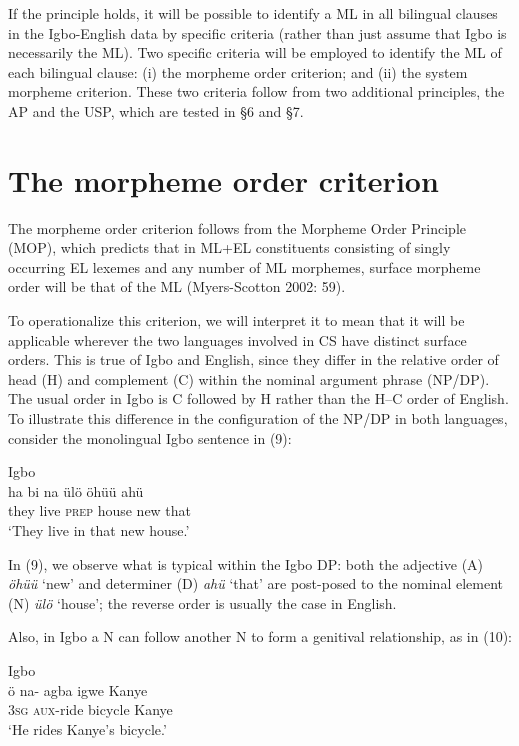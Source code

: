 \documentclass[output=paper]{langsci/langscibook}
\begin{document}
If the principle holds, it will be possible to identify a ML in all bilingual clauses in the Igbo-English data by specific criteria (rather than just assume that Igbo is necessarily the ML). Two specific criteria will be employed to identify the ML of each bilingual clause: (i) the morpheme order criterion; and (ii) the system morpheme criterion. These two criteria follow from two additional principles, the AP and the USP, which are tested in §6 and §7.

\section{The morpheme order criterion}

The morpheme order criterion follows from the Morpheme Order Principle (MOP), which predicts that in ML+EL constituents consisting of singly occurring EL lexemes and any number of ML morphemes, surface morpheme order will be that of the ML (Myers-Scotton 2002: 59). 

To operationalize this criterion, we will interpret it to mean that it will be applicable wherever the two languages involved in CS have distinct surface orders. This is true of Igbo and English, since they differ in the relative order of head (H) and complement (C) within the nominal argument phrase (NP/DP). The usual order in Igbo is C followed by H rather than the H–C order of English. To illustrate this difference in the configuration of the NP/DP in both languages, consider the monolingual Igbo sentence in (9):

\ea
{Igbo}\\
\gll ha    bi  na   ülö  öhüü  ahü\\
     they  live  \textsc{prep}  house  new  that\\
\glt ‘They live in that new house.’
\z

In (9), we observe what is typical within the Igbo DP: both the adjective (A) \textit{öhüü} ‘new’ and determiner (D) \textit{ahü} ‘that’ are post-posed to the nominal element (N) \textit{ülö }‘house’; the reverse order is usually the case in English. 

Also, in Igbo a N can follow another N to form a genitival relationship, as in (10): 

\ea
{Igbo}\\
\gll ö    na- agba  \textsubscript{ }igwe    Kanye\\
     \textsc{3sg}    \textsc{aux}{}-ride  bicycle    Kanye\\
\glt ‘He rides Kanye’s bicycle.’
\z
\end{document}
